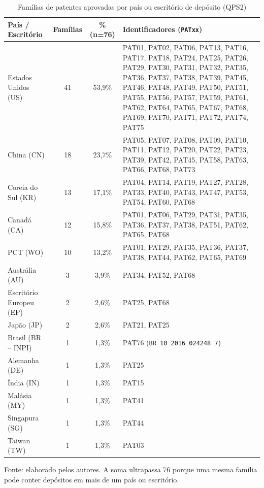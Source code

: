 \documentclass[12pt,a4paper]{article}
\begin{document}
\begin{table}[htbp]
\centering\small
\caption{Famílias de patentes aprovadas por país ou escritório de depósito (QPS2)}\label{tab:pais_dep}
\begin{tabular}{p{3.4cm}ccp{6.8cm}}
\toprule
\textbf{País / Escritório} & \textbf{Famílias} & \textbf{\% (n=76)} & \textbf{Identificadores (\texttt{PATxx})}\\
\midrule
Estados Unidos (US) & 41 & 53,9\% & PAT01, PAT02, PAT06, PAT13, PAT16, PAT17, PAT18, PAT24, PAT25, PAT26, PAT29, PAT30, PAT31, PAT32, PAT35, PAT36, PAT37, PAT38, PAT39, PAT45, PAT46, PAT48, PAT49, PAT50, PAT51, PAT55, PAT56, PAT57, PAT59, PAT61, PAT62, PAT64, PAT65, PAT67, PAT68, PAT69, PAT70, PAT71, PAT72, PAT74, PAT75\\
China (CN) & 18 & 23,7\% & PAT05, PAT07, PAT08, PAT09, PAT10, PAT11, PAT12, PAT20, PAT22, PAT23, PAT39, PAT42, PAT45, PAT58, PAT63, PAT66, PAT68, PAT73\\
Coreia do Sul (KR) & 13 & 17,1\% & PAT04, PAT14, PAT19, PAT27, PAT28, PAT33, PAT40, PAT43, PAT47, PAT53, PAT54, PAT60, PAT68\\
Canadá (CA) & 12 & 15,8\% & PAT01, PAT06, PAT29, PAT31, PAT35, PAT36, PAT37, PAT38, PAT51, PAT62, PAT65, PAT68\\
PCT (WO) & 10 & 13,2\% & PAT01, PAT29, PAT35, PAT36, PAT37, PAT38, PAT44, PAT62, PAT65, PAT69\\
Austrália (AU) & 3 & 3,9\% & PAT34, PAT52, PAT68\\
Escritório Europeu (EP) & 2 & 2,6\% & PAT25, PAT68\\
Japão (JP) & 2 & 2,6\% & PAT21, PAT25\\
Brasil (BR -- INPI) & 1 & 1,3\% & PAT76 (\texttt{BR 10 2016 024248 7})\\
Alemanha (DE) & 1 & 1,3\% & PAT25\\
Índia (IN) & 1 & 1,3\% & PAT15\\
Malásia (MY) & 1 & 1,3\% & PAT41\\
Singapura (SG) & 1 & 1,3\% & PAT44\\
Taiwan (TW) & 1 & 1,3\% & PAT03\\
\bottomrule
\end{tabular}

\smallskip
\footnotesize Fonte: elaborado pelos autores. A soma ultrapassa 76 porque uma mesma família pode conter depósitos em mais de um país ou escritório.
\end{table}
\end{document}

